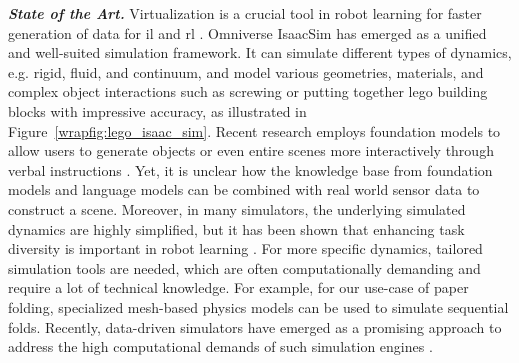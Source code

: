 \documentclass{erc-B2}
\begin{document}
\textit{\textbf{State of the Art.}}
Virtualization is a crucial tool in robot learning for faster generation of data for \gls*{il} \cite{jiang2023user, mandlekar2018roboturk} and \gls*{rl}  \cite{Das_Bechtle_Davchev_Jayaraman_Rai_Meier_2021, serhan2022push, Zenkri2022}. Omniverse IsaacSim \cite{mittal2023orbit} has emerged as a unified and well-suited simulation framework. It can simulate different types of dynamics, e.g. rigid, fluid, and continuum, and model various geometries, materials, and complex object interactions such as screwing \cite{narang2022factory} or putting together lego building blocks with impressive accuracy, as illustrated in Figure~\ref{wrapfig:lego_isaac_sim}. Recent research employs foundation models to allow users to generate objects \cite{shap-e} or even entire scenes more interactively through verbal instructions \cite{wang2023gen}. Yet, it is unclear how the knowledge base from foundation models and language models can be combined with real world sensor data to construct a scene. Moreover, in many simulators, the underlying simulated dynamics are highly simplified, but it has been shown that enhancing task diversity is important in robot learning \cite{fang2023active}. For more specific dynamics, tailored simulation tools \cite{abaqus} are needed, which are often computationally demanding and require a lot of technical knowledge. For example, for our use-case of paper folding, specialized mesh-based physics models can be used \cite{ThaiSH18,NamikiY15,ElbrechterHR12} to simulate sequential folds. 
Recently, data-driven simulators have emerged as a promising approach to address the high computational demands of such simulation engines  \cite{pfaff2021learning, sundaresan2022diffcloud, kandukuri2022physical, linkerhagnerFSM23}. %

\end{document}
